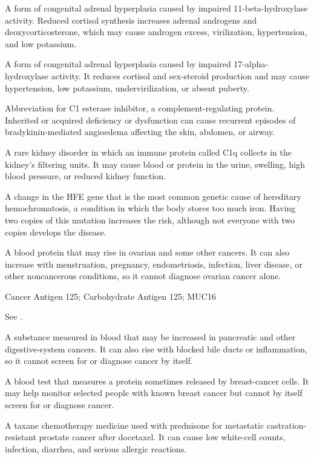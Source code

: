  A form of congenital adrenal hyperplasia caused by impaired 11-beta-hydroxylase activity. Reduced cortisol synthesis increases adrenal androgens and deoxycorticosterone, which may cause androgen excess, virilization, hypertension, and low potassium.

 A form of congenital adrenal hyperplasia caused by impaired 17-alpha-hydroxylase activity. It reduces cortisol and sex-steroid production and may cause hypertension, low potassium, undervirilization, or absent puberty.

 Abbreviation for C1 esterase inhibitor, a complement-regulating protein. Inherited or acquired deficiency or dysfunction can cause recurrent episodes of bradykinin-mediated angioedema affecting the skin, abdomen, or airway.

 A rare kidney disorder in which an immune protein called C1q collects in the kidney’s filtering units. It may cause blood or protein in the urine, swelling, high blood pressure, or reduced kidney function.

 A change in the HFE gene that is the most common genetic cause of hereditary hemochromatosis, a condition in which the body stores too much iron. Having two copies of this mutation increases the risk, although not everyone with two copies develops the disease.

 A blood protein that may rise in ovarian and some other cancers. It can also increase with menstruation, pregnancy, endometriosis, infection, liver disease, or other noncancerous conditions, so it cannot diagnose ovarian cancer alone.

\synonyms
Cancer Antigen 125; Carbohydrate Antigen 125; MUC16

 See .

 A substance measured in blood that may be increased in pancreatic and other digestive-system cancers. It can also rise with blocked bile ducts or inflammation, so it cannot screen for or diagnose cancer by itself.

 A blood test that measures a protein sometimes released by breast-cancer cells. It may help monitor selected people with known breast cancer but cannot by itself screen for or diagnose cancer.

 A taxane chemotherapy medicine used with prednisone for metastatic castration-resistant prostate cancer after docetaxel. It can cause low white-cell counts, infection, diarrhea, and serious allergic reactions.

